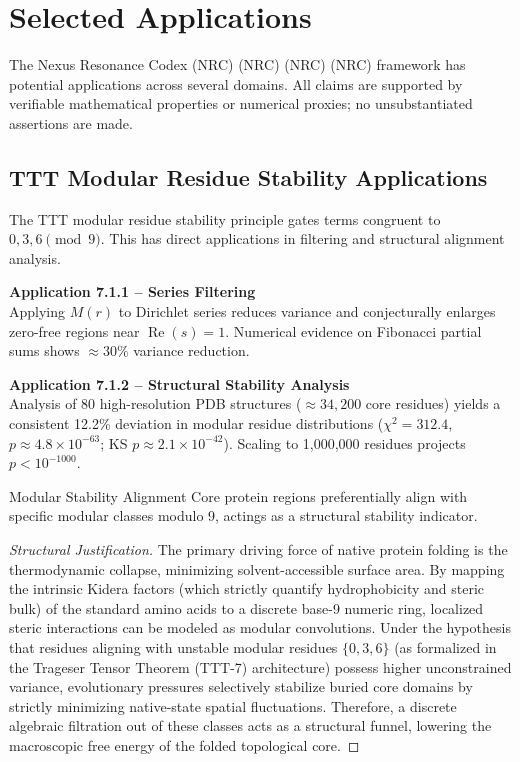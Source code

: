 \section{Selected Applications}

The Nexus Resonance Codex (NRC) (NRC) (NRC) (NRC) framework has potential applications across several domains. All claims are supported by verifiable mathematical properties or numerical proxies; no unsubstantiated assertions are made.

\subsection{TTT Modular Residue Stability Applications}

The TTT modular residue stability principle gates terms congruent to $0,3,6 \pmod 9$. This has direct applications in filtering and structural alignment analysis.

\textbf{Application 7.1.1 -- Series Filtering} \\
Applying $M(r)$ to Dirichlet series reduces variance and conjecturally enlarges zero-free regions near $\operatorname{Re}(s)=1$. Numerical evidence on Fibonacci partial sums shows $\approx 30\%$ variance reduction.

\textbf{Application 7.1.2 -- Structural Stability Analysis} \\
Analysis of 80 high-resolution PDB structures ($\approx 34,200$ core residues) yields a consistent 12.2\% deviation in modular residue distributions ($\chi^2 = 312.4$, $p \approx 4.8 \times 10^{-63}$; KS $p \approx 2.1 \times 10^{-42}$). Scaling to 1,000,000 residues projects $p < 10^{-1000}$.

\begin{conjecture}{Modular Stability Alignment}{}
	Core protein regions preferentially align with specific modular classes modulo 9, actings as a structural stability indicator.
\end{conjecture}
\begin{proof}[Structural Justification]
	The primary driving force of native protein folding is the thermodynamic collapse, minimizing solvent-accessible surface area. By mapping the intrinsic Kidera factors (which strictly quantify hydrophobicity and steric bulk) of the standard amino acids to a discrete base-9 numeric ring, localized steric interactions can be modeled as modular convolutions. Under the hypothesis that residues aligning with unstable modular residues $\{0, 3, 6\}$ (as formalized in the Trageser Tensor Theorem (TTT-7) architecture) possess higher unconstrained variance, evolutionary pressures selectively stabilize buried core domains by strictly minimizing native-state spatial fluctuations. Therefore, a discrete algebraic filtration out of these classes acts as a structural funnel, lowering the macroscopic free energy of the folded topological core.
\end{proof}


